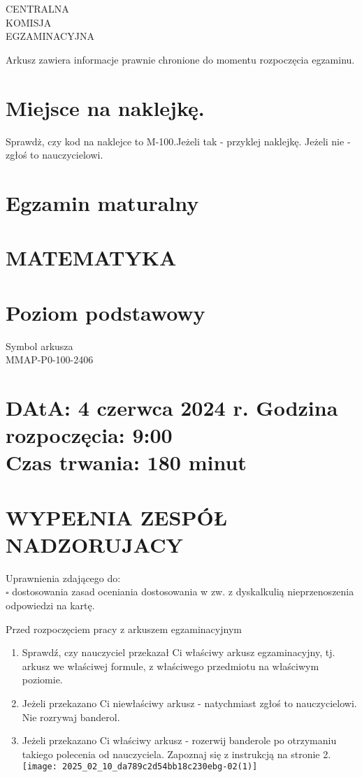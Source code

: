 \documentclass[10pt]{article}
\author{LICZBA PUNKTÓW DO UZYSKANIA: 46}
\date{}
\begin{document}
\maketitle
CENTRALNA\\
KOMISJA\\
EGZAMINACYJNA

Arkusz zawiera informacje prawnie chronione do momentu rozpoczęcia egzaminu.

\section*{Miejsce na naklejkę.}
 Sprawdż, czy kod na naklejce to M-100.Jeżeli tak - przyklej naklejkę. Jeżeli nie - zgłoś to nauczycielowi.

\section*{Egzamin maturalny}
\section*{MATEMATYKA}
\section*{Poziom podstawowy}
Symbol arkusza\\
MMAP-P0-100-2406

\section*{DAtA: 4 czerwca 2024 r. Godzina rozpoczęcia: 9:00 \\
 Czas trwania: \(\mathbf{1 8 0}\) minut}
\section*{WYPEŁNIA ZESPÓŁ NADZORUJACY}
Uprawnienia zdającego do:\\
\(\square\) dostosowania zasad oceniania dostosowania w zw. z dyskalkulią nieprzenoszenia odpowiedzi na kartę.

Przed rozpoczęciem pracy z arkuszem egzaminacyjnym

\begin{enumerate}
  \item Sprawdź, czy nauczyciel przekazał Ci właściwy arkusz egzaminacyjny, tj. arkusz we właściwej formule, z właściwego przedmiotu na właściwym poziomie.
  \item Jeżeli przekazano Ci niewłaściwy arkusz - natychmiast zgłoś to nauczycielowi. Nie rozrywaj banderol.
  \item Jeżeli przekazano Ci właściwy arkusz - rozerwij banderole po otrzymaniu takiego polecenia od nauczyciela. Zapoznaj się z instrukcją na stronie 2.\\
\texttt{[image: 2025\_02\_10\_da789c2d54bb18c230ebg-02(1)]}
\end{enumerate}
\end{document}
